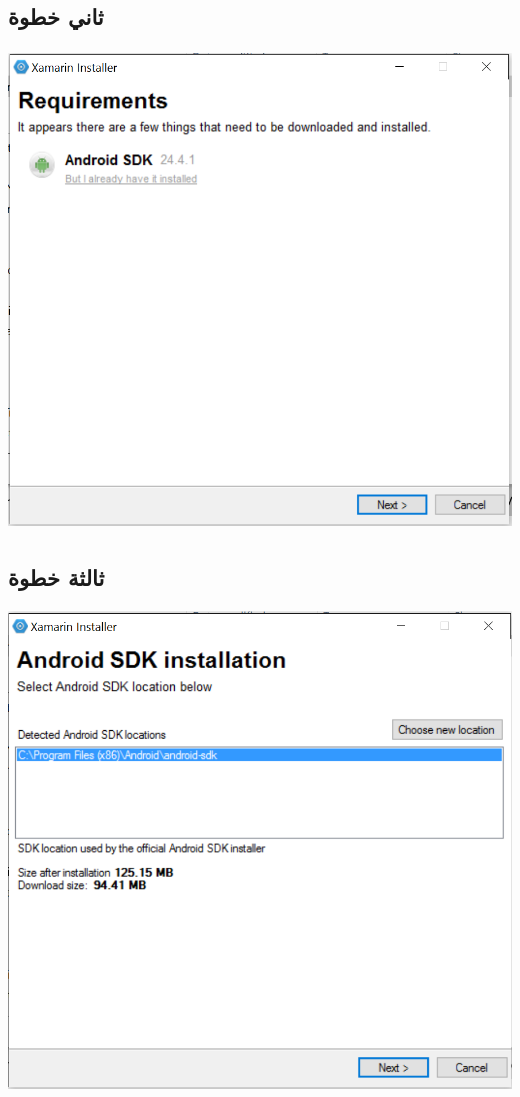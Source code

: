  \subsection{ثاني خطوة }
 
 
 \begin{otherlanguage}{english}
 	
 	
 	\includegraphics[height=5in,width=6in]{installer3.png}
 	
 	
 \end{otherlanguage}
  \subsection{ثالثة خطوة }
  
  
  \begin{otherlanguage}{english}
  	
  	
  	\includegraphics[height=5in,width=6in]{installer4.png}
  	
  	
  \end{otherlanguage}
